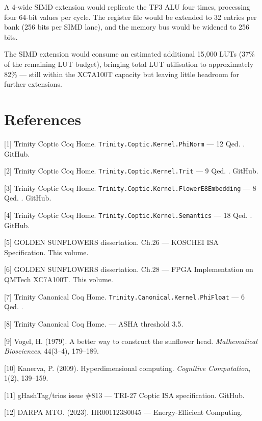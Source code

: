 A 4-wide SIMD extension would replicate the TF3 ALU four times,
processing four 64-bit values per cycle. The register file would
be extended to 32 entries per bank (256 bits per SIMD lane), and
the memory bus would be widened to 256 bits.

The SIMD extension would consume an estimated additional 15,000
LUTs (37\% of the remaining LUT budget), bringing total LUT
utilisation to approximately 82\% --- still within the XC7A100T
capacity but leaving little headroom for further extensions.

\section{References}\label{fa_71:references}

[1] Trinity Coptic Coq Home.
\texttt{Trinity.Coptic.Kernel.PhiNorm} --- 12 Qed.
. GitHub.

[2] Trinity Coptic Coq Home.
\texttt{Trinity.Coptic.Kernel.Trit} --- 9 Qed.
. GitHub.

[3] Trinity Coptic Coq Home.
\texttt{Trinity.Coptic.Kernel.FlowerE8Embedding} --- 8 Qed.
.
GitHub.

[4] Trinity Coptic Coq Home.
\texttt{Trinity.Coptic.Kernel.Semantics} --- 18 Qed.
. GitHub.

[5] GOLDEN SUNFLOWERS dissertation. Ch.26 --- KOSCHEI ISA
Specification. This volume.

[6] GOLDEN SUNFLOWERS dissertation. Ch.28 --- FPGA Implementation
on QMTech XC7A100T. This volume.

[7] Trinity Canonical Coq Home.
\texttt{Trinity.Canonical.Kernel.PhiFloat} --- 6 Qed.
.

[8] Trinity Canonical Coq Home.
--- ASHA threshold 3.5.

[9] Vogel, H. (1979). A better way to construct the sunflower
head. \emph{Mathematical Biosciences}, 44(3--4), 179--189.

[10] Kanerva, P. (2009). Hyperdimensional computing.
\emph{Cognitive Computation}, 1(2), 139--159.

[11] gHashTag/trios issue \#813 --- TRI-27 Coptic ISA
specification. GitHub.

[12] DARPA MTO. (2023). HR001123S0045 --- Energy-Efficient
Computing.

